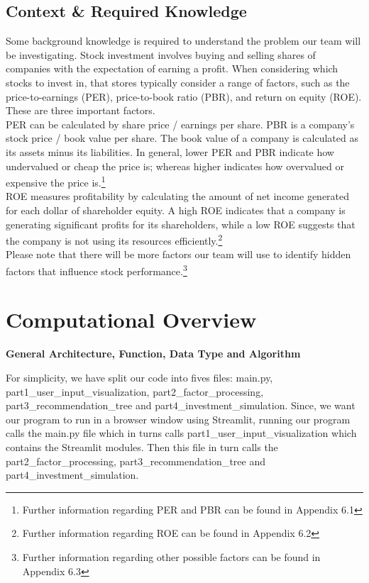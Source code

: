 \documentclass[fontsize=11pt]{article}
\begin{document}
\subsection{Context \& Required Knowledge}
Some background knowledge is required to understand the problem our team will be investigating. Stock investment involves buying and selling shares of companies with the expectation of earning a profit. When considering which stocks to invest in, that stores typically consider a range of factors, such as the price-to-earnings (PER), price-to-book ratio (PBR), and return on equity (ROE). These are three important factors.\\

PER can be calculated by share price / earnings per share. PBR is a company’s stock price / book value per share. The book value of a company is calculated as its assets minus its liabilities. In general, lower PER and PBR indicate how undervalued or cheap the price is; whereas higher indicates how overvalued or expensive the price is.\footnote{Further information regarding PER and PBR can be found in Appendix 6.1}\\

ROE measures profitability by calculating the amount of net income generated for each dollar of shareholder equity. A high ROE indicates that a company is generating significant profits for its shareholders, while a low ROE suggests that the company is not using its resources efficiently.\footnote{Further information regarding ROE can be found in Appendix 6.2}
\\

Please note that there will be more factors our team will use to identify hidden factors that influence stock performance.\footnote{Further information regarding other possible factors can be found in Appendix 6.3}
\section{Computational Overview}
\textbf{General Architecture, Function, Data Type and Algorithm}



For simplicity, we have split our code into fives files: main.py, part1\_user\_input\_visualization, part2\_factor\_processing, part3\_recommendation\_tree and part4\_investment\_simulation. Since, we want our program to run in a browser window using Streamlit, running our program calls the main.py file which in turns calls part1\_user\_input\_visualization which contains the Streamlit modules. Then this file in turn calls the part2\_factor\_processing, part3\_recommendation\_tree and part4\_investment\_simulation. \\
\end{document}

